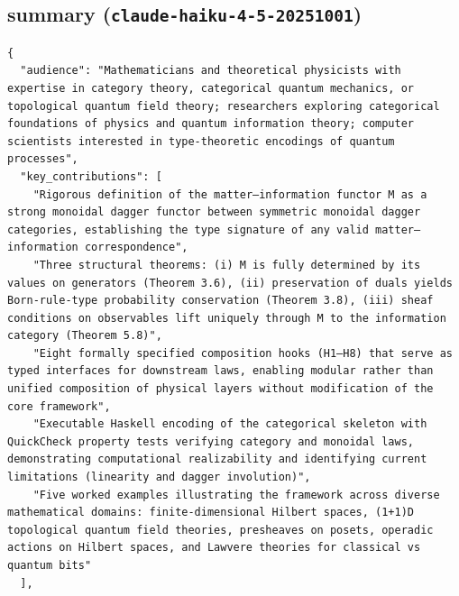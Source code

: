 \documentclass[11pt]{article}
\begin{document}
\subsection*{summary (\texttt{claude-haiku-4-5-20251001})}
\begin{verbatim}
{
  "audience": "Mathematicians and theoretical physicists with expertise in category theory, categorical quantum mechanics, or topological quantum field theory; researchers exploring categorical foundations of physics and quantum information theory; computer scientists interested in type-theoretic encodings of quantum processes",
  "key_contributions": [
    "Rigorous definition of the matter–information functor M as a strong monoidal dagger functor between symmetric monoidal dagger categories, establishing the type signature of any valid matter–information correspondence",
    "Three structural theorems: (i) M is fully determined by its values on generators (Theorem 3.6), (ii) preservation of duals yields Born-rule-type probability conservation (Theorem 3.8), (iii) sheaf conditions on observables lift uniquely through M to the information category (Theorem 5.8)",
    "Eight formally specified composition hooks (H1–H8) that serve as typed interfaces for downstream laws, enabling modular rather than unified composition of physical layers without modification of the core framework",
    "Executable Haskell encoding of the categorical skeleton with QuickCheck property tests verifying category and monoidal laws, demonstrating computational realizability and identifying current limitations (linearity and dagger involution)",
    "Five worked examples illustrating the framework across diverse mathematical domains: finite-dimensional Hilbert spaces, (1+1)D topological quantum field theories, presheaves on posets, operadic actions on Hilbert spaces, and Lawvere theories for classical vs quantum bits"
  ],

\end{verbatim}
\end{document}
